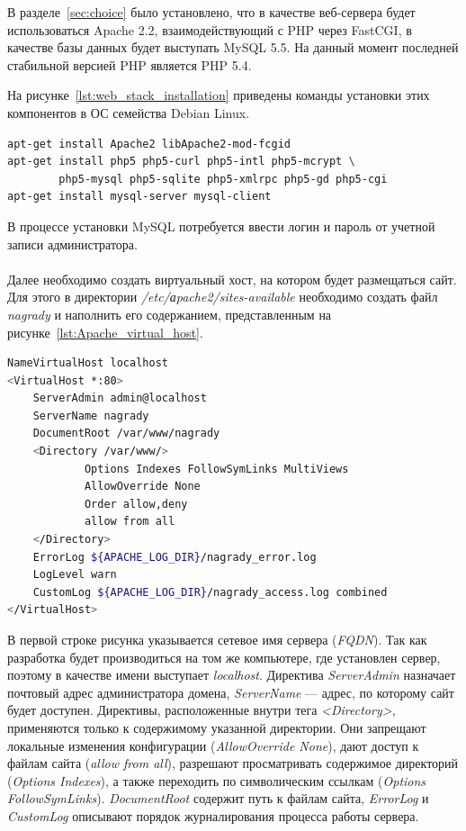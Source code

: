 В разделе~\ref{sec:choice} было установлено, что в качестве веб-сервера будет
использоваться Apache 2.2, взаимодействующий с PHP через FastCGI,
в качестве базы данных будет выступать MySQL 5.5.
На данный момент последней стабильной версией PHP является PHP 5.4. 

На рисунке~\ref{lst:web_stack_installation} приведены команды установки этих
компонентов в ОС семейства Debian Linux.

\pagebreak

\begin{lstlisting}[language=bash,
  caption=Команды установки веб-стека для работы Drupal,
  label=lst:web_stack_installation]
apt-get install Apache2 libApache2-mod-fcgid
apt-get install php5 php5-curl php5-intl php5-mcrypt \ 
        php5-mysql php5-sqlite php5-xmlrpc php5-gd php5-cgi
apt-get install mysql-server mysql-client
\end{lstlisting}

В процессе установки MySQL потребуется ввести логин и пароль от учетной записи
администратора.

\paragraph{}
Далее необходимо создать виртуальный хост, на котором будет размещаться сайт.
Для этого в директории \textit{/etc/аpache2/sites-available} необходимо создать
файл \textit{nagrady} и наполнить его содержанием, представленным на
рисунке~\ref{lst:Apache_virtual_host}.

\begin{lstlisting}[language=bash,xleftmargin=2em,
  caption=Содержимое конфигурационного файла Apache,
  label=lst:Apache_virtual_host]
NameVirtualHost localhost
<VirtualHost *:80>
    ServerAdmin admin@localhost
    ServerName nagrady
    DocumentRoot /var/www/nagrady
    <Directory /var/www/>
            Options Indexes FollowSymLinks MultiViews
            AllowOverride None
            Order allow,deny
            allow from all
    </Directory>
    ErrorLog ${APACHE_LOG_DIR}/nagrady_error.log
    LogLevel warn
    CustomLog ${APACHE_LOG_DIR}/nagrady_access.log combined
</VirtualHost>
\end{lstlisting}

В первой строке рисунка указывается сетевое имя сервера (\textit{FQDN}). 
Так как разработка будет производиться на том же компьютере, 
где установлен сервер, поэтому в качестве имени выступает \textit{localhost}.
Директива \textit{ServerAdmin} назначает почтовый адрес администратора домена, 
\textit{ServerName} --- адрес, по которому сайт будет доступен.
Директивы, расположенные внутри тега \textit{<Directory>}, применяются только
к содержимому указанной директории.
Они запрещают локальные изменения конфигурации (\textit{AllowOverride None}),
дают доступ к файлам сайта (\textit{allow from all}),
разрешают просматривать содержимое директорий (\textit{Options Indexes}),
а также переходить по символическим ссылкам (\textit{Options FollowSymLinks}).
\textit{DocumentRoot} содержит путь к файлам сайта,
\textit{ErrorLog} и \textit{CustomLog} описывают порядок журналирования
процесса работы сервера.

